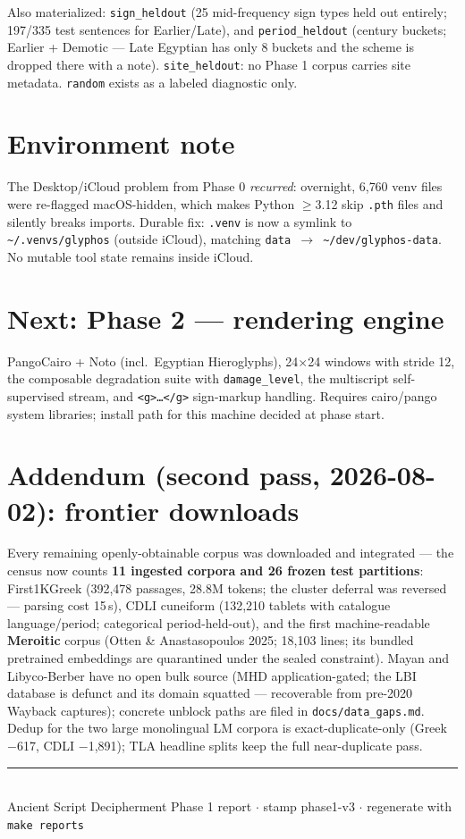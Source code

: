\documentclass[11pt]{article}
\newcommand{\ReportStamp}{phase1-v3}
\begin{document}
Also materialized: \texttt{sign\_heldout} (25 mid-frequency sign types held
out entirely; 197/335 test sentences for Earlier/Late), and
\texttt{period\_heldout} (century buckets; Earlier + Demotic --- Late Egyptian
has only 8 buckets and the scheme is dropped there with a note).
\texttt{site\_heldout}: no Phase 1 corpus carries site metadata.
\texttt{random} exists as a labeled diagnostic only.

\section{Environment note}
The Desktop/iCloud problem from Phase 0 \emph{recurred}: overnight, 6{,}760
venv files were re-flagged macOS-hidden, which makes Python $\ge$3.12 skip
\texttt{.pth} files and silently breaks imports. Durable fix: \texttt{.venv}
is now a symlink to \texttt{\textasciitilde/.venvs/glyphos} (outside iCloud),
matching \texttt{data $\to$ \textasciitilde/dev/glyphos-data}. No mutable tool
state remains inside iCloud.

\section{Next: Phase 2 --- rendering engine}
PangoCairo + Noto (incl.\ Egyptian Hieroglyphs), 24$\times$24 windows with
stride 12, the composable degradation suite with \texttt{damage\_level}, the
multiscript self-supervised stream, and \texttt{<g>\dots</g>} sign-markup
handling. Requires cairo/pango system libraries; install path for this
machine decided at phase start.


\section*{Addendum (second pass, 2026-08-02): frontier downloads}
Every remaining openly-obtainable corpus was downloaded and integrated ---
the census now counts \textbf{11 ingested corpora and 26 frozen test
partitions}: First1KGreek (392{,}478 passages, 28.8M tokens; the cluster
deferral was reversed --- parsing cost 15\,s), CDLI cuneiform (132{,}210
tablets with catalogue language/period; categorical period-held-out), and
the first machine-readable \textbf{Meroitic} corpus (Otten \&
Anastasopoulos 2025; 18{,}103 lines; its bundled pretrained embeddings are
quarantined under the sealed constraint). Mayan and Libyco-Berber have no
open bulk source (MHD application-gated; the LBI database is defunct and
its domain squatted --- recoverable from pre-2020 Wayback captures);
concrete unblock paths are filed in \texttt{docs/data\_gaps.md}. Dedup for
the two large monolingual LM corpora is exact-duplicate-only (Greek $-$617,
CDLI $-$1{,}891); TLA headline splits keep the full near-duplicate pass.

\vfill
\noindent\rule{\linewidth}{0.4pt}\\
{\small Ancient Script Decipherment Phase 1 report \(\cdot\) stamp \ReportStamp{} \(\cdot\)
regenerate with \texttt{make reports}}
\end{document}
